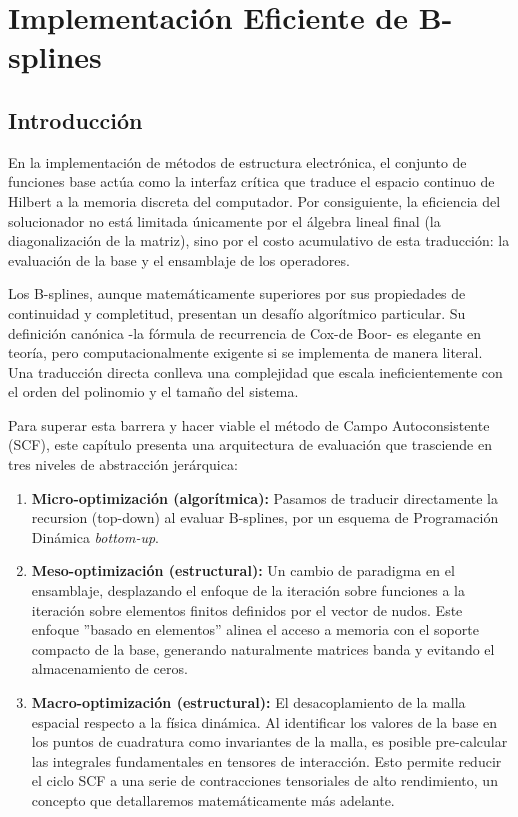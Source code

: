 \chapter{Implementación Eficiente de B-splines}
\label{ch:imp_splines}


\section{Introducción}

En la implementación de métodos de estructura electrónica, el conjunto de funciones base actúa como la interfaz crítica que traduce el espacio continuo de Hilbert a la memoria discreta del computador. Por consiguiente, la eficiencia del solucionador no está limitada únicamente por el álgebra lineal final (la diagonalización de la matriz), sino por el costo acumulativo de esta traducción: la evaluación de la base y el ensamblaje de los operadores.

Los B-splines, aunque matemáticamente superiores por sus propiedades de continuidad y completitud, presentan un desafío algorítmico particular. Su definición canónica -la fórmula de recurrencia de Cox-de Boor- es elegante en teoría, pero computacionalmente exigente si se implementa de manera literal. Una traducción directa conlleva una complejidad que escala ineficientemente con el orden del polinomio y el tamaño del sistema.

Para superar esta barrera y hacer viable el método de Campo Autoconsistente (SCF), este capítulo presenta una arquitectura de evaluación que trasciende en tres niveles de abstracción jerárquica:

\begin{enumerate}
\item \textbf{Micro-optimización (algorítmica):} Pasamos de traducir directamente la recursion (top-down) al evaluar B-splines, por un esquema de Programación Dinámica \textit{bottom-up}.
\item \textbf{Meso-optimización (estructural):} Un cambio de paradigma en el ensamblaje, desplazando el enfoque de la iteración sobre funciones a la iteración sobre elementos finitos definidos por el vector de nudos. Este enfoque ”basado en elementos” alinea el acceso a memoria con el soporte compacto de la base, generando naturalmente matrices banda y evitando el almacenamiento de ceros.
\item \textbf{Macro-optimización (estructural):} El desacoplamiento de la malla espacial respecto a la física dinámica. Al identificar los valores de la base en los puntos de cuadratura como invariantes de la malla, es posible pre-calcular las integrales fundamentales en tensores de interacción. Esto permite reducir el ciclo SCF a una serie de contracciones tensoriales de alto rendimiento, un concepto que detallaremos matemáticamente más adelante.
\end{enumerate}

